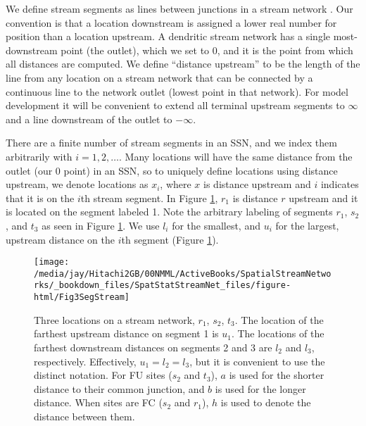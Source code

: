 \documentclass[]{book}
\theoremstyle{definition}
\theoremstyle{definition}
\theoremstyle{definition}
\theoremstyle{remark}
\begin{document}
We define stream segments as lines between junctions in a stream network
\citep{Ver:Pete:Theo:spat:2006, Ver:Pete:Move:2010}. Our convention is
that a location downstream is assigned a lower real number for position
than a location upstream. A dendritic stream network has a single
most-downstream point (the outlet), which we set to 0, and it is the
point from which all distances are computed. We define ``distance
upstream'' to be the length of the line from any location on a stream
network that can be connected by a continuous line to the network outlet
(lowest point in that network). For model development it will be
convenient to extend all terminal upstream segments to \(\infty\) and a
line downstream of the outlet to \(-\infty\).

There are a finite number of stream segments in an SSN, and we index
them arbitrarily with \(i = 1,2,\ldots\). Many locations will have the
same distance from the outlet (our 0 point) in an SSN, so to uniquely
define locations using distance upstream, we denote locations as
\(x_i\), where \(x\) is distance upstream and \(i\) indicates that it is
on the \(i\)th stream segment. In Figure \ref{fig:Fig3SegStream},
\(r_1\) is distance \(r\) upstream and it is located on the segment
labeled 1. Note the arbitrary labeling of segments \(r_1\), \(s_2\), and
\(t_3\) as seen in Figure \ref{fig:Fig3SegStream}. We use \(l_i\) for
the smallest, and \(u_i\) for the largest, upstream distance on the
\(i\)th segment (Figure \ref{fig:Fig3SegStream}).

\begin{figure}[h]

{\centering \texttt{[image: /media/jay/Hitachi2GB/00NMML/ActiveBooks/SpatialStreamNetworks/\_bookdown\_files/SpatStatStreamNet\_files/figure-html/Fig3SegStream]} 

}

\caption{Three locations on a stream network, $r_1$, $s_2$, $t_3$.  The location of the farthest upstream distance on segment 1 is $u_1$.  The locations of the farthest downstream distances on segments 2 and 3 are $l_2$ and $l_3$, respectively.  Effectively, $u_1 = l_2 = l_3$, but it is convenient to use the distinct notation. For FU sites ($s_2$ and $t_3$), $a$ is used for the shorter distance to their common junction, and $b$ is used for the longer distance.  When sites are FC ($s_2$ and $r_1$), $h$ is used to denote the distance between them.}\label{fig:Fig3SegStream}
\end{figure}
\end{document}
